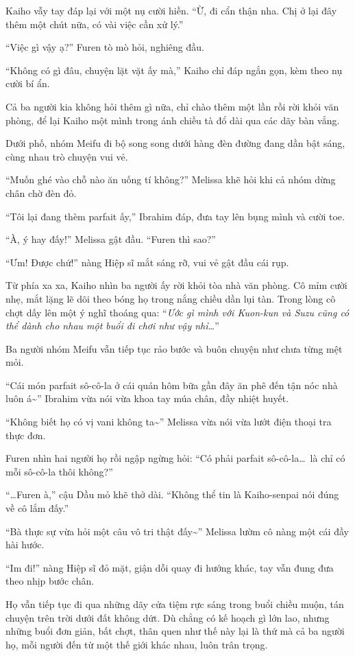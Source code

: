 \documentclass[../main.tex]{subfiles}
\begin{document}
Kaiho vẫy tay đáp lại với một nụ cười hiền. ``Ừ, đi cẩn thận nha. Chị ở lại đây thêm một chút nữa, có vài việc cần xử lý.''

``Việc gì vậy ạ?'' Furen tò mò hỏi, nghiêng đầu.

``Không có gì đâu, chuyện lặt vặt ấy mà,'' Kaiho chỉ đáp ngắn gọn, kèm theo nụ cười bí ẩn.

Cả ba người kia không hỏi thêm gì nữa, chỉ chào thêm một lần rồi rời khỏi văn phòng, để lại Kaiho một mình trong ánh chiều tà đổ dài qua các dãy bàn vắng.

\ct

Dưới phố, nhóm Meifu đi bộ song song dưới hàng đèn đường đang dần bật sáng, cùng nhau trò chuyện vui vẻ.

``Muốn ghé vào chỗ nào ăn uống tí không?'' Melissa khẽ hỏi khi cả nhóm dừng chân chờ đèn đỏ.

``Tôi lại đang thèm parfait ấy,'' Ibrahim đáp, đưa tay lên bụng mình và cười toe.

``À, ý hay đấy!'' Melissa gật đầu. ``Furen thì sao?''

``Ưm! Được chứ!'' nàng Hiệp sĩ mắt sáng rỡ, vui vẻ gật đầu cái rụp.

Từ phía xa xa, Kaiho nhìn ba người ấy rời khỏi tòa nhà văn phòng. Cô mỉm cười nhẹ, mắt lặng lẽ dõi theo bóng họ trong nắng chiều dần lụi tàn. Trong lòng cô chợt dấy lên một ý nghĩ thoáng qua: ``\textit{Ước gì mình với Kuon-kun và Suzu cũng có thể dành cho nhau một buổi đi chơi như vậy nhỉ\dots}''

Ba người nhóm Meifu vẫn tiếp tục rảo bước và buôn chuyện như chưa từng mệt mỏi.

``Cái món parfait sô-cô-la ở cái quán hôm bữa gần đây ăn phê đến tận nóc nhà luôn á\~{}'' Ibrahim vừa nói vừa khoa tay múa chân, đầy nhiệt huyết.

``Không biết họ có vị vani không ta\~{}'' Melissa vừa nói vừa lướt điện thoại tra thực đơn.

Furen nhìn hai người họ rồi ngập ngừng hỏi:
``Có phải parfait sô-cô-la\dots\ là chỉ có mỗi sô-cô-la thôi không?''

``\dots Furen à,'' cậu Dầu mỏ khẽ thở dài. ``Không thể tin là Kaiho-senpai nói đúng về cô lắm đấy.''

``Bà thực sự vừa hỏi một câu vô tri thật đấy\~{}'' Melissa lườm cô nàng một cái đầy hài hước.

``Im đi!'' nàng Hiệp sĩ đỏ mặt, giận dỗi quay đi hướng khác, tay vẫn đung đưa theo nhịp bước chân.

Họ vẫn tiếp tục đi qua những dãy cửa tiệm rực sáng trong buổi chiều muộn, tán chuyện trên trời dưới đất không dứt. Dù chẳng có kế hoạch gì lớn lao, nhưng những buổi đơn giản, bất chợt, thân quen như thế này  lại là thứ mà cả ba người họ, mỗi người đến từ một thế giới khác nhau, luôn trân trọng.
\end{document}
